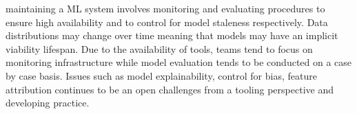 \DIFdelbegin {}\DIFdelend \DIFaddbegin \textit{} \DIFaddend maintaining a ML system involves monitoring and evaluating procedures to ensure high availability and to control for model staleness respectively. Data distributions may change over time meaning that models may have an implicit viability lifespan. Due to the availability of tools, teams tend to focus on monitoring infrastructure while model evaluation tends to be conducted on a case by case basis. Issues such as model explainability, control for bias, feature attribution continues to be an open challenges from a tooling perspective and developing practice.

\DIFdelbegin %

